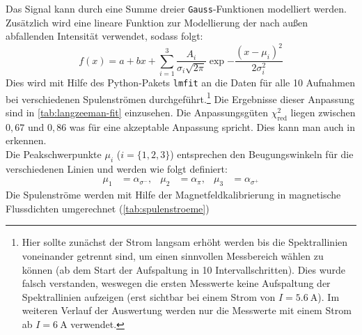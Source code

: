 \noindent Das Signal kann durch eine Summe dreier \texttt{Gauss}-Funktionen modelliert werden. Zusätzlich wird eine lineare Funktion zur Modellierung der nach außen abfallenden Intensität verwendet, sodass folgt:
\begin{equation*}
    f(x) = a + bx + \sum^{3}_{i=1} \frac{A_i}{\sigma_i\sqrt{2\pi}}\exp{-\frac{(x-\mu_i)^2}{2\sigma_i^2}}
\end{equation*}
\newpage
Dies wird mit Hilfe des Python-Pakets \texttt{lmfit} an die Daten für alle 10 Aufnahmen bei verschiedenen Spulenströmen durchgeführt.\footnote{Hier sollte zunächst der Strom langsam erhöht werden bis die Spektrallinien voneinander getrennt sind, um einen sinnvollen Messbereich wählen zu können (ab dem Start der Aufspaltung in 10 Intervallschritten). Dies wurde falsch verstanden, weswegen die ersten Messwerte keine Aufspaltung der Spektrallinien aufzeigen (erst sichtbar bei einem Strom von $I=\SI{5,6}{\ampere}$). Im weiteren Verlauf der Auswertung werden nur die Messwerte mit einem Strom ab $I = \SI{6}{\ampere}$ verwendet.}
Die Ergebnisse dieser Anpassung sind in \cref{tab:langzeeman-fit} einzusehen. Die Anpassungsgüten $\chi_{\text{red}}^2$ liegen zwischen $0,67$ und $0,86$ was für eine akzeptable Anpassung spricht. Dies kann man auch in  erkennen.\\
Die Peakschwerpunkte $\mu_i$ ($i = \{1,2,3\}$) entsprechen den Beugungswinkeln für die verschiedenen Linien und werden wie folgt definiert:
\begin{align*}
    \mu_1 &= \alpha_{\sigma^-}, & \mu_2 &= \alpha_{\pi}, & \mu_3 &= \alpha_{\sigma^+}
\end{align*} 
Die Spulenströme werden mit Hilfe der Magnetfeldkalibrierung in magnetische Flussdichten umgerechnet (\cref{tab:spulenstroeme})
